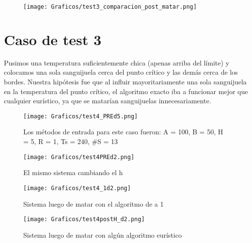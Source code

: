 \documentclass[double, 1.5in, 12pt]{beavtex}
\begin{document}
\begin{figure}[H]
\begin{center}
	\texttt{[image: Graficos/test3\_comparacion\_post\_matar.png]}
	\caption{}
	\label{fig:frog}
	\end{center}
\end{figure}

\section{Caso de test 3}

Pusimos una temperatura suficientemente chica (apenas arriba del l\'imite) y colocamos una sola sanguijuela cerca del punto cr\'itico y las dem\'as cerca de los bordes. Nuestra hip\'otesis fue que al influir mayoritariamente una sola sanguijuela en la temperatura del punto cr\'itico, el algoritmo exacto iba a funcionar mejor que cualquier eur\'istico, ya que se matar\'ian sanguijuelas innecesariamente.

\begin{figure}[H]
\begin{center}
	\texttt{[image: Graficos/test4\_PREd5.png]}
	\caption{Los m\'etodos de entrada para este caso fueron:
A = 100, 
B = 50, 
H = 5, 
R = 1, 
Ts = 240, 
$\#$S = 13}
	\label{fig:frog}
	\end{center}
\end{figure}

\begin{figure}[H]
\begin{center}
	\texttt{[image: Graficos/test4PREd2.png]}
	\caption{El mismo sistema cambiando el h}
	\label{fig:frog}
	\end{center}
\end{figure}

\begin{figure}[H]
\begin{center}
	\texttt{[image: Graficos/test4\_1d2.png]}
	\caption{Sistema luego de matar con el algoritmo de a 1}
	\label{fig:frog}
	\end{center}
\end{figure}

\begin{figure}[H]
\begin{center}
	\texttt{[image: Graficos/test4postH\_d2.png]}
	\caption{Sistema luego de matar con alg\'un algoritmo eur\'istico}
	\label{fig:frog}
	\end{center}
\end{figure}
\end{document}
